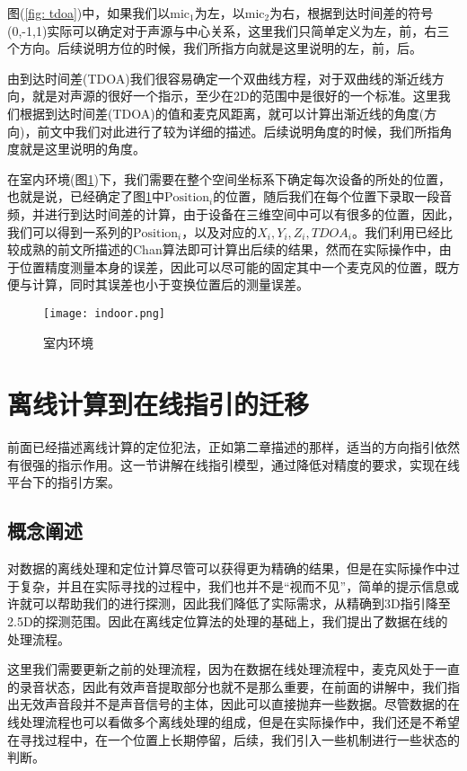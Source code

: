 \documentclass[winfonts]{njuthesis}
\begin{document}
		图(\ref{fig: tdoa})中，如果我们以$\text{mic}_1$为左，以$\text{mic}_2$为右，根据到达时间差的符号(0,-1,1)实际可以确定对于声源与中心关系，这里我们只简单定义为左，前，右三个方向。后续说明方位的时候，我们所指方向就是这里说明的左，前，后。
	
		由到达时间差(TDOA)我们很容易确定一个双曲线方程，对于双曲线的渐近线方向，就是对声源的很好一个指示，至少在2D的范围中是很好的一个标准。这里我们根据到达时间差(TDOA)的值和麦克风距离，就可以计算出渐近线的角度(方向)，前文中我们对此进行了较为详细的描述。后续说明角度的时候，我们所指角度就是这里说明的角度。
		
		在室内环境(图\ref{fig: indoor})下，我们需要在整个空间坐标系下确定每次设备的所处的位置，也就是说，已经确定了图\ref{fig: indoor}中$\text{Position}_i$的位置，随后我们在每个位置下录取一段音频，并进行到达时间差的计算，由于设备在三维空间中可以有很多的位置，因此，我们可以得到一系列的$\text{Position}_i$，以及对应的$X_i,Y_i,Z_i,TDOA_i$。我们利用已经比较成熟的前文所描述的Chan算法即可计算出后续的结果，然而在实际操作中，由于位置精度测量本身的误差，因此可以尽可能的固定其中一个麦克风的位置，既方便与计算，同时其误差也小于变换位置后的测量误差。
		
		\begin{figure}[H]
			\centering
			\texttt{[image: indoor.png]} 
			\caption{{室内环境}}
			\label{fig: indoor}
		\end{figure}
		
	
	\section{离线计算到在线指引的迁移}
		
		前面已经描述离线计算的定位犯法，正如第二章描述的那样，适当的方向指引依然有很强的指示作用。这一节讲解在线指引模型，通过降低对精度的要求，实现在线平台下的指引方案。
	
		\subsection{概念阐述}
			
			对数据的离线处理和定位计算尽管可以获得更为精确的结果，但是在实际操作中过于复杂，并且在实际寻找的过程中，我们也并不是“视而不见”，简单的提示信息或许就可以帮助我们的进行探测，因此我们降低了实际需求，从精确到3D指引降至2.5D的探测范围。因此在离线定位算法的处理的基础上，我们提出了数据在线的处理流程。
		
			这里我们需要更新之前的处理流程，因为在数据在线处理流程中，麦克风处于一直的录音状态，因此有效声音提取部分也就不是那么重要，在前面的讲解中，我们指出无效声音段并不是声音信号的主体，因此可以直接抛弃一些数据。尽管数据的在线处理流程也可以看做多个离线处理的组成，但是在实际操作中，我们还是不希望在寻找过程中，在一个位置上长期停留，后续，我们引入一些机制进行一些状态的判断。
			
\end{document}
